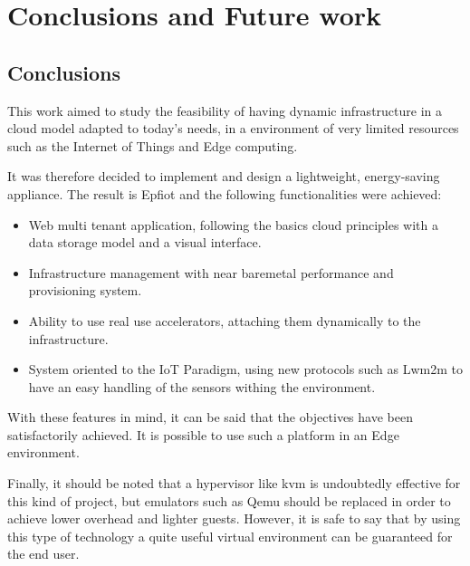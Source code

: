 
\cleardoublepage


\chapter{Conclusions and Future work}
\label{makereference7}
\section{Conclusions}
\label{makereference7.1}

This work aimed to study the feasibility of having dynamic infrastructure in a cloud model adapted to today's needs, in a environment of very limited resources such as the Internet of Things and Edge computing.

It was therefore decided to implement and design a lightweight, energy-saving appliance. The result is Epfiot and the following functionalities were achieved:
\begin{itemize}
    \item Web multi tenant application, following the basics cloud principles with a data storage model and a visual interface.
    \item Infrastructure management with near baremetal performance and provisioning system.
    \item Ability to use real use accelerators, attaching them dynamically to the infrastructure.
    \item System oriented to the IoT Paradigm, using new protocols such as Lwm2m to have an easy handling of the sensors withing the environment.
\end{itemize}

With these features in mind, it can be said that the objectives have been satisfactorily achieved. It is possible to use such a platform in an Edge environment.

Finally, it should be noted that a hypervisor like kvm is undoubtedly effective for this kind of project, but emulators such as Qemu should be replaced in order to achieve lower overhead and lighter guests. However, it is safe to say that by using this type of technology a quite useful virtual environment can be guaranteed for the end user.

